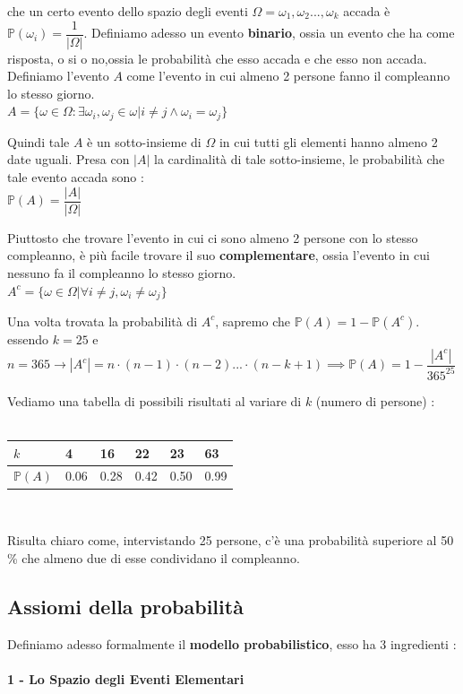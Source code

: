 \documentclass[12pt, letterpaper]{article}
\begin{document}
che un certo evento dello spazio degli eventi \(\Omega={\omega_1,\omega_2...,\omega_k }\) accada è \(\mathbb{P}({\omega_i})=\dfrac{1}{|\Omega|}\).
Definiamo adesso un evento \textbf{binario}, ossia un evento che ha come risposta, o si o no,ossia le probabilità che 
esso accada e che esso non accada. Definiamo l'evento \(A\) come l'evento in cui almeno 2 persone fanno il compleanno
lo stesso giorno.\\
\centering\( A=\{\omega \in \Omega :\exists \omega_i,\omega_j \in \omega | i\ne j \land \omega_i=\omega_j\} \)\\
\raggedright
Quindi tale \(A\) è un sotto-insieme di \(\Omega\) in cui tutti gli elementi hanno almeno 2 date uguali. 
Presa con \(|A|\) la cardinalità di tale sotto-insieme, le probabilità che tale evento accada sono :\\
\centering\( \mathbb{P}(A)=\dfrac{|A|}{|\Omega|} \)\\
\raggedright Piuttosto che trovare l'evento in cui ci sono almeno 2 persone con lo stesso  compleanno,
è più facile trovare il suo \textbf{complementare}, ossia l'evento in cui nessuno fa il compleanno lo stesso giorno.
\\\centering\( A^c=\{\omega \in \Omega | \forall i\ne j, \omega_i \ne \omega_j\} \)\\
\raggedright Una volta trovata la probabilità di \(A^c\), sapremo che \(\mathbb{P}(A)=1-\mathbb{P}(A^c)\).
\\\centering essendo \(k=25 \) e \( n=365 \rightarrow |A^c|=n \cdot (n-1) \cdot (n-2)...\cdot (n-k+1)  \implies
 \mathbb{P} (A)=1-\dfrac{|A^c|}{365^{25}}\)  \\
\raggedright Vediamo una tabella di possibili risultati al variare di \(k\) (numero di persone) :\\\hphantom{.}\\
\centering
    \begin{tabular}{|l|l|l|l|l|l|}
    \hline
    \(k\)  & 4    & 16   & 22   & 23   & 63   \\ \hline
    \(\mathbb{P}(A)\) & 0.06 & 0.28 & 0.42 & 0.50 & 0.99 \\ \hline
    \end{tabular}
\\\raggedright
 Risulta chiaro come, intervistando 25 persone, c'è una probabilità superiore 
al 50 \% che almeno due di esse condividano il compleanno.
\subsection{Assiomi della probabilità}
Definiamo adesso formalmente il \textbf{modello probabilistico}, esso ha 3 ingredienti :
\\\hphantom{.}\\\textbf{1 - Lo Spazio degli Eventi Elementari}
\end{document}

